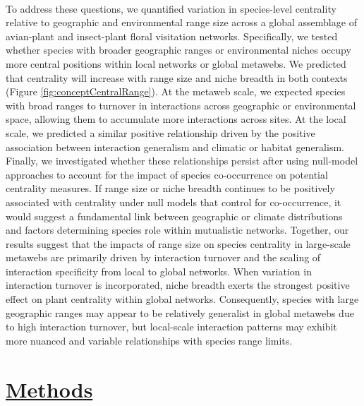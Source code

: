 \paragraph*{}
To address these questions, we quantified variation in species-level centrality relative to geographic and environmental range size across a global assemblage of avian-plant and insect-plant floral visitation networks. Specifically, we tested whether species with broader geographic ranges or environmental niches occupy more central positions within local networks or global metawebs. We predicted that centrality will increase with range size and niche breadth in both contexts (Figure \ref{fig:conceptCentralRange}). At the metaweb scale, we expected species with broad ranges to turnover in interactions across geographic or environmental space, allowing them to accumulate more interactions across sites. At the local scale, we predicted a similar positive relationship driven by the positive association between interaction generalism and climatic or habitat generalism. Finally, we investigated whether these relationships persist after using null-model approaches to account for the impact of species co-occurrence on potential centrality measures. If range size or niche breadth continues to be positively associated with centrality under null models that control for co-occurrence, it would suggest a fundamental link between geographic or climate distributions and factors determining species role within mutualistic networks. Together, our results suggest that the impacts of range size on species centrality in large-scale metawebs are primarily driven by interaction turnover and the scaling of interaction specificity from local to global networks. When variation in interaction turnover is incorporated, niche breadth exerts the strongest positive effect on plant centrality within global networks. Consequently, species with large geographic ranges may appear to be relatively generalist in global metawebs due to high interaction turnover, but local-scale interaction patterns may exhibit more nuanced and variable relationships with species range limits. 

\section*{\textbf{\underline{Methods}}}

